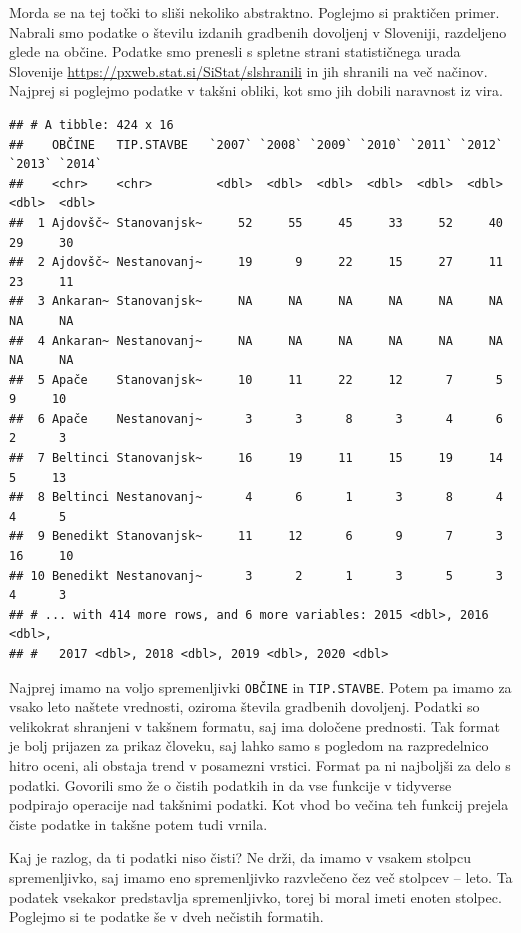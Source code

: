 \documentclass[
]{book}
\begin{document}
Morda se na tej točki to sliši nekoliko abstraktno. Poglejmo si praktičen primer. Nabrali smo podatke o številu izdanih gradbenih dovoljenj v Sloveniji, razdeljeno glede na občine. Podatke smo prenesli s spletne strani statističnega urada Slovenije \url{https://pxweb.stat.si/SiStat/slshranili} in jih shranili na več načinov. Najprej si poglejmo podatke v takšni obliki, kot smo jih dobili naravnost iz vira.

\begin{verbatim}
## # A tibble: 424 x 16
##    OBČINE   TIP.STAVBE   `2007` `2008` `2009` `2010` `2011` `2012` `2013` `2014`
##    <chr>    <chr>         <dbl>  <dbl>  <dbl>  <dbl>  <dbl>  <dbl>  <dbl>  <dbl>
##  1 Ajdovšč~ Stanovanjsk~     52     55     45     33     52     40     29     30
##  2 Ajdovšč~ Nestanovanj~     19      9     22     15     27     11     23     11
##  3 Ankaran~ Stanovanjsk~     NA     NA     NA     NA     NA     NA     NA     NA
##  4 Ankaran~ Nestanovanj~     NA     NA     NA     NA     NA     NA     NA     NA
##  5 Apače    Stanovanjsk~     10     11     22     12      7      5      9     10
##  6 Apače    Nestanovanj~      3      3      8      3      4      6      2      3
##  7 Beltinci Stanovanjsk~     16     19     11     15     19     14      5     13
##  8 Beltinci Nestanovanj~      4      6      1      3      8      4      4      5
##  9 Benedikt Stanovanjsk~     11     12      6      9      7      3     16     10
## 10 Benedikt Nestanovanj~      3      2      1      3      5      3      4      3
## # ... with 414 more rows, and 6 more variables: 2015 <dbl>, 2016 <dbl>,
## #   2017 <dbl>, 2018 <dbl>, 2019 <dbl>, 2020 <dbl>
\end{verbatim}

Najprej imamo na voljo spremenljivki \texttt{OBČINE} in \texttt{TIP.STAVBE}. Potem pa imamo za vsako leto naštete vrednosti, oziroma števila gradbenih dovoljenj. Podatki so velikokrat shranjeni v takšnem formatu, saj ima določene prednosti. Tak format je bolj prijazen za prikaz človeku, saj lahko samo s pogledom na razpredelnico hitro oceni, ali obstaja trend v posamezni vrstici. Format pa ni najboljši za delo s podatki. Govorili smo že o čistih podatkih in da vse funkcije v tidyverse podpirajo operacije nad takšnimi podatki. Kot vhod bo večina teh funkcij prejela čiste podatke in takšne potem tudi vrnila.

Kaj je razlog, da ti podatki niso čisti? Ne drži, da imamo v vsakem stolpcu spremenljivko, saj imamo eno spremenljivko razvlečeno čez več stolpcev -- leto. Ta podatek vsekakor predstavlja spremenljivko, torej bi moral imeti enoten stolpec. Poglejmo si te podatke še v dveh nečistih formatih.
\end{document}
